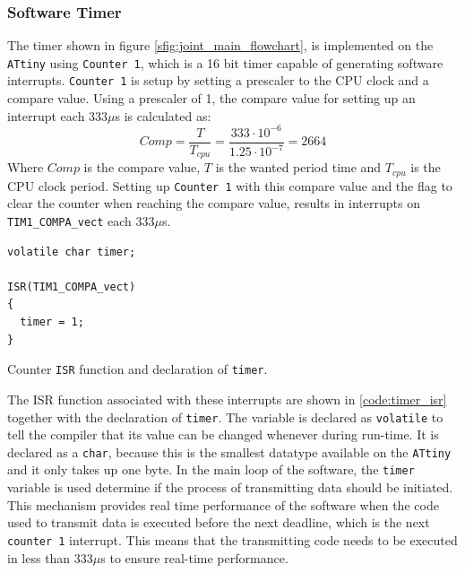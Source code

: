 {\subsubsection{Software Timer}
\label{ssub:software_timer}
The timer shown in figure \ref{sfig:joint_main_flowchart}, is implemented on the \texttt{ATtiny} using \texttt{Counter 1}, which is a 16 bit timer capable of generating software interrupts.
\texttt{Counter 1} is setup by setting a prescaler to the CPU clock and a compare value.
Using a prescaler of 1, the compare value for setting up an interrupt each 333$\mu$s is calculated as:
\begin{equation}
	Comp = \frac{T}{T_{cpu}} = \frac{333 \cdot 10^{-6}}{1.25\cdot 10^{-7}} = 2664
\end{equation}
Where $Comp$ is the compare value, $T$ is the wanted period time and $T_{cpu}$ is the CPU clock period.
Setting up \texttt{Counter 1} with this compare value and the flag to clear the counter when reaching the compare value, results in interrupts on \texttt{TIM1\_COMPA\_vect} each 333$\mu$s.

\begin{listing}[H] 
\begin{verbatim}
volatile char timer;

ISR(TIM1_COMPA_vect)
{ 
  timer = 1;
}
\end{verbatim}
\caption{Counter \texttt{ISR} function and declaration of \texttt{timer}.}
\label{code:timer_isr}
\end{listing}

The ISR function associated with these interrupts are shown in \ref{code:timer_isr} together with the declaration of \texttt{timer}.
The variable is declared as \texttt{volatile} to tell the compiler that its value can be changed whenever during run-time. 
It is declared as a \texttt{char}, because this is the smallest datatype available on the \texttt{ATtiny} and it only takes up one byte. 
In the main loop of the software, the \texttt{timer} variable is used determine if the process of transmitting data should be initiated.
This mechanism provides real time performance of the software when the code used to transmit data is executed before the next deadline, which is the next \texttt{counter 1} interrupt.
This means that the transmitting code needs to be executed in less than 333$\mu$s to ensure real-time performance.

}
